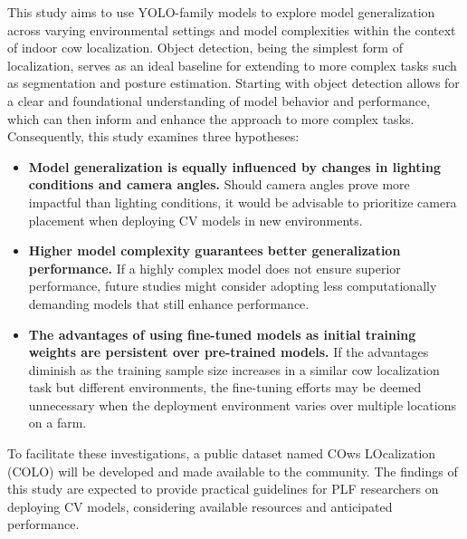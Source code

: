 This study aims to use YOLO-family models to explore model generalization across varying environmental settings and model complexities within the context of indoor cow localization. Object detection, being the simplest form of localization, serves as an ideal baseline for extending to more complex tasks such as segmentation and posture estimation. Starting with object detection allows for a clear and foundational understanding of model behavior and performance, which can then inform and enhance the approach to more complex tasks. Consequently, this study examines three hypotheses:

\begin{itemize}
    \item \textbf{Model generalization is equally influenced by changes in lighting conditions and camera angles.} Should camera angles prove more impactful than lighting conditions, it would be advisable to prioritize camera placement when deploying CV models in new environments.
    \item \textbf{Higher model complexity guarantees better generalization performance.} If a highly complex model does not ensure superior performance, future studies might consider adopting less computationally demanding models that still enhance performance.
    \item \textbf{The advantages of using fine-tuned models as initial training weights are persistent over pre-trained models.} If the advantages diminish as the training sample size increases in a similar cow localization task but different environments, the fine-tuning efforts may be deemed unnecessary when the deployment environment varies over multiple locations on a farm.
\end{itemize}

To facilitate these investigations, a public dataset named COws LOcalization (COLO) \cite{COLODataset2023} will be developed and made available to the community. The findings of this study are expected to provide practical guidelines for PLF researchers on deploying CV models, considering available resources and anticipated performance.